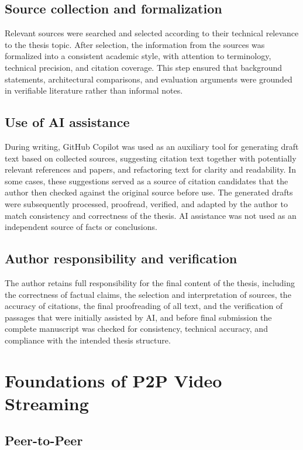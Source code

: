 \subsection{Source collection and formalization}
Relevant sources were searched and selected according to their technical relevance to the thesis topic. After selection, the information from the sources was formalized into a consistent academic style, with attention to terminology, technical precision, and citation coverage. This step ensured that background statements, architectural comparisons, and evaluation arguments were grounded in verifiable literature rather than informal notes.

\subsection{Use of AI assistance}
During writing, GitHub Copilot was used as an auxiliary tool for generating draft text based on collected sources, suggesting citation text together with potentially relevant references and papers, and refactoring text for clarity and readability. In some cases, these suggestions served as a source of citation candidates that the author then checked against the original source before use. The generated drafts were subsequently processed, proofread, verified, and adapted by the author to match consistency and correctness of the thesis. AI assistance was not used as an independent source of facts or conclusions.

\subsection{Author responsibility and verification}
The author retains full responsibility for the final content of the thesis, including the correctness of factual claims, the selection and interpretation of sources, the accuracy of citations, the final proofreading of all text, and the verification of passages that were initially assisted by AI, and before final submission the complete manuscript was checked for consistency, technical accuracy, and compliance with the intended thesis structure.

\section{Foundations of \ac{P2P} Video Streaming}
\subsection{Peer-to-Peer}

